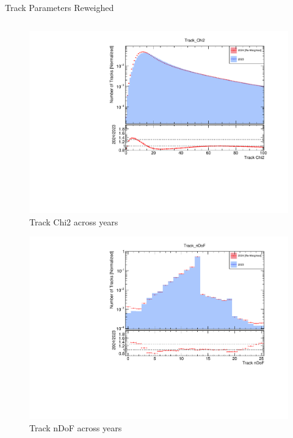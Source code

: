 \begin{frame}{Track Parameters Reweighed}
    \begin{columns}
        \begin{column}{0.5\linewidth}
            \vspace{-0.45cm}
            \begin{figure}
                \includegraphics[width=\linewidth]{./ReweighedPlots/Track_Chi2_Reweighted.pdf}
                \caption{Track Chi2 across years}
            \end{figure}
            \vspace{-0.9cm}
            \begin{figure}
                \includegraphics[width=\linewidth]{./ReweighedPlots/Track_nDoF_Reweighted.pdf}
                \caption{Track nDoF across years}

\end{figure}
\end{column}
\end{columns}
\end{frame}
